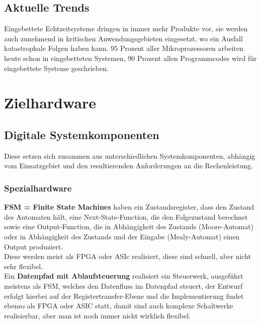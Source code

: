 \documentclass[a4paper, 10 pt, conference]{ieeeconf}
\begin{document}
\subsection*{\textbf{Aktuelle Trends}}
Eingebettete Echtzeitsysteme dringen in immer mehr Produkte vor, sie werden auch zunehmend in kritischen Anwendungsgebieten eingesetzt, wo ein Ausfall katastrophale Folgen haben kann. $95$ Prozent aller Mikroprozessoren arbeiten heute schon in eingebetteten Systemen, $90$ Prozent allen Programmcodes wird für eingebettete Systeme geschrieben. 

\section{\textbf{Zielhardware}}
\subsection{\textbf{Digitale Systemkomponenten}}
Diese setzen sich zusammen aus unterschiedlichen Systemkomponenten, abhängig vom Einsatzgebiet und den resultierenden Anforderungen an die Rechenleistung. 
\subsubsection*{\textbf{Spezialhardware}}
\textbf{FSM = Finite State Machines} haben ein Zustandsregister, dass den Zustand des Automaten hält, eine Next-State-Function, die den Folgezustand berechnet sowie eine Output-Function, die in Abhängigkeit des Zustands (Moore-Automat) oder in Abhängigkeit des Zustands und der Eingabe (Mealy-Automat) einen Output produziert. \\
Diese werden meist als FPGA oder ASIc realisiert, diese sind schnell, aber nicht sehr flexibel. \\
Ein \textbf{Datenpfad mit Ablaufsteuerung} realisiert ein Steuerwerk, ausgeführt meistens als FSM, welches den Datenfluss im Datenpfad steuert, der Entwurf erfolgt hierbei auf der Registertransfer-Ebene und die Implementierung findet ebenso als FPGA oder ASIC statt, damit sind auch komplexe Schaltwerke realisierbar, aber man ist noch immer nicht wirklich flexibel. 
\end{document}
